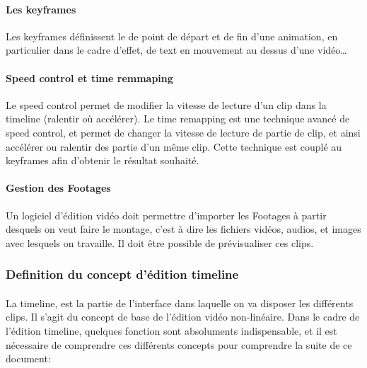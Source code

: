 \paragraph{Les keyframes}
Les keyframes définissent le de point de départ et de fin d'une animation,
en particulier dans le cadre d'effet, de text en mouvement au dessus
d'une vidéo\ldots

\paragraph{Speed control et time remmaping}
Le speed control permet de modifier la vitesse de lecture d'un clip dans la
timeline (ralentir où accélérer). Le time remapping est une technique avancé
de speed control, et permet de changer la vitesse de lecture de partie de clip,
et ainsi accélérer ou ralentir des partie d'un même clip. Cette technique est
couplé au keyframes afin d'obtenir le résultat souhaité.

\paragraph{Gestion des Footages}
Un logiciel d'édition vidéo doit permettre d'importer les Footages  à partir
desquels on veut faire le montage, c'est à dire les fichiers vidéos, audios,
et images avec lesquels on travaille. Il doit être possible de prévisualiser ces
clips.

\subsubsection{Definition du concept d'édition timeline}
\paragraph{}
La timeline, est la partie de l'interface dans laquelle on va disposer les
différents clips. Il s'agit du concept de base de l'édition vidéo non-linéaire.
Dans le cadre de l'édition timeline, quelques fonction sont absoluments
indispensable, et il est nécessaire de comprendre ces différents concepts
pour comprendre la suite de ce document:


